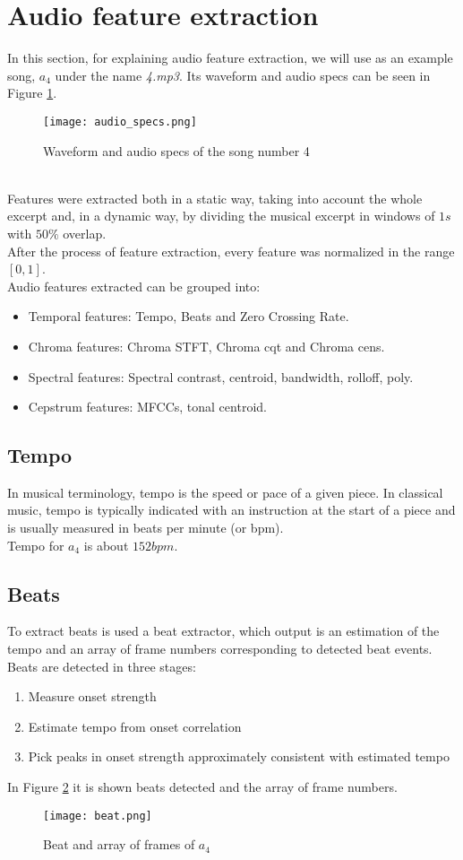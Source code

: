 \section{Audio feature extraction}
In this section, for explaining audio feature extraction, we will use as an example song, $a_4$ under the name \textit{4.mp3}. Its waveform and audio specs can be seen in Figure \ref{fig:audio_specs}.
\begin{figure}[h]
    \centering
    \texttt{[image: audio\_specs.png]} 
	\caption{Waveform and audio specs of the song number 4}
    \label{fig:audio_specs}
\end{figure}
\\
Features were extracted both in a static way, taking into account the whole excerpt and, in a dynamic way, by dividing the musical excerpt in windows of $1s$ with $50\%$ overlap.
\\
After the process of feature extraction, every feature was normalized in the range $[0,1]$.
\\
Audio features extracted can be grouped into:
\begin{itemize}
	\item Temporal features: Tempo, Beats and Zero Crossing Rate.
	\item Chroma features: Chroma STFT, Chroma cqt and Chroma cens.
	\item Spectral features: Spectral contrast, centroid, bandwidth, rolloff, poly.
	\item Cepstrum features: MFCCs, tonal centroid.
\end{itemize}

\subsection{Tempo}
In musical terminology, tempo  is the speed or pace of a given piece. In classical music, tempo is typically indicated with an instruction at the start of a piece and is usually measured in beats per minute (or bpm).
\\
Tempo for $a_4$ is about $152 bpm$.

\subsection{Beats}
To extract beats is used a beat extractor, which output is an estimation of the tempo and an array of frame numbers corresponding to detected beat events.
\\
Beats are detected in three stages:
\begin{enumerate}	
	\item Measure onset strength
	\item Estimate tempo from onset correlation
	\item Pick peaks in onset strength approximately consistent with estimated tempo
\end{enumerate}
In Figure \ref{fig:beat} it is shown beats detected and the array of frame numbers.
\begin{figure}[h]
    \centering
    \texttt{[image: beat.png]} 
	\caption{Beat and array of frames of $a_4$}
    \label{fig:beat}
\end{figure}

